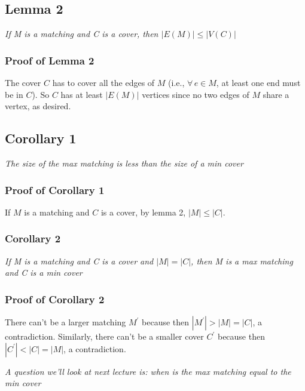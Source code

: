 \documentclass{report}
\begin{document}
\subsection{Lemma 2}
\begin{center}
\textit{If M is a matching and C is a cover, then $|E(M)| \leq |V(C)|$}
\end{center}
\subsubsection{Proof of Lemma 2}
The cover $C$ has to cover all the edges of $M$ (i.e., $\forall \, e \in M$, at least one end must be in $C$). So $C$ has at least $|E(M)|$ vertices since no two edges of $M$ share a vertex, as desired.
\subsection{Corollary 1}
\begin{center}
\textit{The size of the max matching is less than the size of a min cover}
\end{center}
\subsubsection{Proof of Corollary 1}
If $M$ is a matching and $C$ is a cover, by lemma 2, $|M|\leq|C|$.
\subsubsection{Corollary 2}
\begin{center}
\textit{If M is a matching and C is a cover and $|M|=|C|$, then M is a max matching and C is a min cover}
\end{center}
\subsubsection{Proof of Corollary 2}
There can't be a larger matching $M^\prime$ because then $|M^\prime| > |M| = |C|$, a contradiction. Similarly, there can't be a smaller cover $C^\prime$ because then $|C^\prime| < |C| = |M|$, a contradiction.
\begin{center}
\textit{A question we'll look at next lecture is: when is the max matching equal to the min cover}
\end{center}
\end{document}
